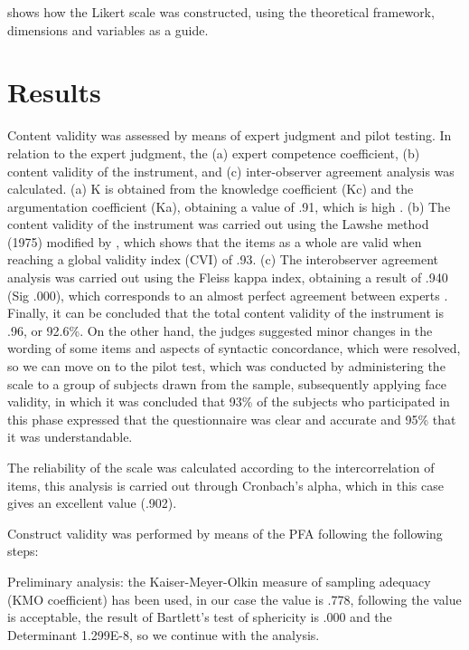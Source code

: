 \documentclass{textolivre}
\begin{document}
 shows how the Likert scale was constructed, using the theoretical framework, dimensions and variables as a guide.

\section{Results}\label{sec3results}
Content validity was assessed by means of expert judgment and pilot testing. In relation to the expert judgment, the (a) expert competence coefficient, (b) content validity of the instrument, and (c) inter-observer agreement analysis was calculated. (a) K is obtained from the knowledge coefficient (Kc) and the argumentation coefficient (Ka), obtaining a value of .91, which is high \cite{blasco2010}. %
(b) The content validity of the instrument was carried out using the Lawshe method (1975) modified by \textcite{tristan2008}, %
which shows that the items as a whole are valid when reaching a global validity index (CVI) of .93. (c) The interobserver agreement analysis was carried out using the Fleiss kappa index, obtaining a result of .940 (Sig .000), which corresponds to an almost perfect agreement between experts \cite{landis1977}. %
Finally, it can be concluded that the total content validity of the instrument is .96, or 92.6\%. On the other hand, the judges suggested minor changes in the wording of some items and aspects of syntactic concordance, which were resolved, so we can move on to the pilot test, which was conducted by administering the scale to a group of subjects drawn from the sample, subsequently applying face validity, in which it was concluded that 93\% of the subjects who participated in this phase expressed that the questionnaire was clear and accurate and 95\% that it was understandable.

The reliability of the scale was calculated according to the intercorrelation of items, this analysis is carried out through Cronbach's alpha, which in this case gives an excellent value (.902).

Construct validity was performed by means of the PFA following the following steps:

Preliminary analysis: the Kaiser-Meyer-Olkin measure of sampling adequacy (KMO coefficient) has been used, in our case the value is .778, following \textcite{kaiser1974} %
the value is acceptable, the result of Bartlett's test of sphericity is .000 and the Determinant 1.299E-8, so we continue with the analysis.
\end{document}
